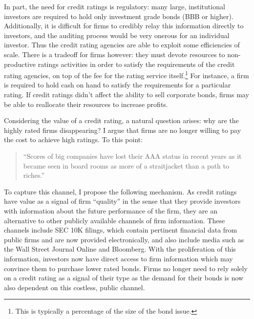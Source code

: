 \documentclass[notitlepage]{article}
\begin{document}

In part, the need for credit ratings is regulatory: many large, institutional investors are required to hold only investment grade bonds (BBB or higher). Additionally, it is difficult for firms to credibly relay this information directly to investors, and the auditing process would be very onerous for an individual investor. Thus the credit rating agencies are able to exploit some efficiencies of scale. There is a tradeoff for firms however: they must devote resources to non-productive ratings activities in order to satisfy the requirements of the credit rating agencies, on top of the fee for the rating service itself.\footnote{This is typically a percentage of the size of the bond issue.} For instance, a firm is required to hold cash on hand to satisfy the requirements for a particular rating. If credit ratings didn't affect the ability to sell corporate bonds, firms may be able to reallocate their resources to increase profits.

Considering the value of a credit rating, a natural question arises: why are the highly rated firms disappearing? I argue that firms are no longer willing to pay the cost to achieve high ratings. To this point:
\begin{quote}
``Scores of big companies have lost their AAA status in recent years as it became seen in board rooms as more of a straitjacket than a path to riches.''
\end{quote}
To capture this channel, I propose the following mechanism. As credit ratings have value as a signal of firm ``quality'' in the sense that they provide investors with information about the future performance of the firm, they are an alternative to other publicly available channels of firm information. These channels include SEC 10K filings, which contain pertinent financial data from public firms and are now provided electronically, and also include media such as the Wall Street Journal Online and Bloomberg. With the proliferation of this information, investors now have direct access to firm information which may convince them to purchase lower rated bonds. Firms no longer need to rely solely on a credit rating as a signal of their type as the demand for their bonds is now also dependent on this costless, public channel.
\end{document}

